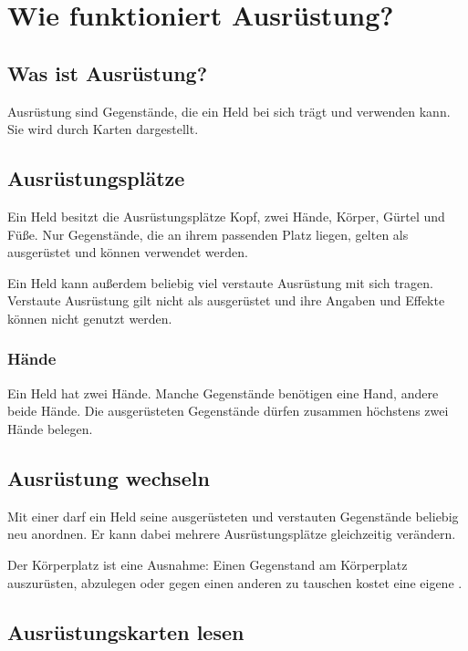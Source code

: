 \chapter{Wie funktioniert Ausrüstung?}

\section{Was ist Ausrüstung?}

Ausrüstung sind Gegenstände, die ein Held bei sich trägt und verwenden kann. Sie wird durch Karten dargestellt.

\section{Ausrüstungsplätze}

Ein Held besitzt die Ausrüstungsplätze Kopf, zwei Hände, Körper, Gürtel und Füße. Nur Gegenstände, die an ihrem passenden Platz liegen, gelten als ausgerüstet und können verwendet werden.

Ein Held kann außerdem beliebig viel verstaute Ausrüstung mit sich tragen. Verstaute Ausrüstung gilt nicht als ausgerüstet und ihre Angaben und Effekte können nicht genutzt werden.

\subsection{Hände}

Ein Held hat zwei Hände. Manche Gegenstände benötigen eine Hand, andere beide Hände. Die ausgerüsteten Gegenstände dürfen zusammen höchstens zwei Hände belegen.

\section{Ausrüstung wechseln}

Mit einer \moveAction{} darf ein Held seine ausgerüsteten und verstauten Gegenstände beliebig neu anordnen. Er kann dabei mehrere Ausrüstungsplätze gleichzeitig verändern.

Der Körperplatz ist eine Ausnahme: Einen Gegenstand am Körperplatz auszurüsten, abzulegen oder gegen einen anderen zu tauschen kostet eine eigene \standardAction.

\section{Ausrüstungskarten lesen}


